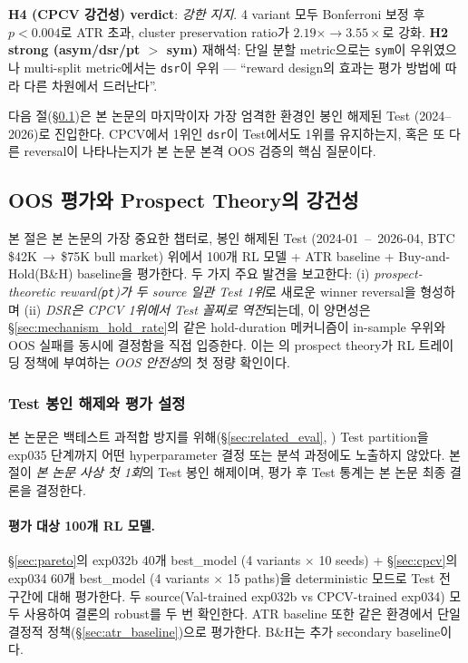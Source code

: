 \documentclass[11pt, a4paper]{article}
\begin{document}
\textbf{H4 (CPCV 강건성) verdict}: \emph{강한 지지}. 4 variant 모두 Bonferroni
보정 후 $p < 0.004$로 ATR 초과, cluster preservation ratio가 $2.19\times \to
3.55\times$로 강화. \textbf{H2 strong (asym/dsr/pt $>$ sym)} 재해석: 단일 분할
metric으로는 \texttt{sym}이 우위였으나 multi-split metric에서는 \texttt{dsr}이
우위 --- ``reward design의 효과는 평가 방법에 따라 다른 차원에서 드러난다''.

다음 절(\S\ref{sec:oos})은 본 논문의 마지막이자 가장 엄격한 환경인 봉인 해제된
Test (2024--2026)로 진입한다. CPCV에서 1위인 \texttt{dsr}이 Test에서도 1위를
유지하는지, 혹은 또 다른 reversal이 나타나는지가 본 논문 본격 OOS 검증의 핵심
질문이다.

\subsection{OOS 평가와 Prospect Theory의 강건성}
\label{sec:oos}

본 절은 본 논문의 가장 중요한 챕터로, 봉인 해제된 Test (2024-01 \,--\, 2026-04,
BTC \$42K\,$\to$\,\$75K bull market) 위에서 100개 RL 모델 + ATR baseline +
Buy-and-Hold(B\&H) baseline을 평가한다. 두 가지 주요 발견을 보고한다:
(i) \emph{prospect-theoretic reward(\texttt{pt})가 두 source 일관 Test 1위}로
새로운 winner reversal을 형성하며 (ii) \emph{DSR은 CPCV 1위에서 Test 꼴찌로
역전}되는데, 이 양면성은 \S\ref{sec:mechanism_hold_rate}의 같은 hold-duration
메커니즘이 in-sample 우위와 OOS 실패를 동시에 결정함을 직접 입증한다. 이는
\citet{kahneman1979prospect}의 prospect theory가 RL 트레이딩 정책에 부여하는
\emph{OOS 안전성}의 첫 정량 확인이다.

\subsubsection{Test 봉인 해제와 평가 설정}
\label{sec:oos_setup}

본 논문은 백테스트 과적합 방지를 위해(\S\ref{sec:related_eval},
\citealt{gort2022backtest}) Test partition을 exp035 단계까지 어떤 hyperparameter
결정 또는 분석 과정에도 노출하지 않았다. 본 절이 \emph{본 논문 사상 첫
1회}의 Test 봉인 해제이며, 평가 후 Test 통계는 본 논문 최종 결론을 결정한다.

\paragraph{평가 대상 100개 RL 모델.}
\S\ref{sec:pareto}의 exp032b 40개 best\_model (4 variants $\times$ 10 seeds) +
\S\ref{sec:cpcv}의 exp034 60개 best\_model (4 variants $\times$ 15 paths)을
deterministic 모드로 Test 전 구간에 대해 평가한다. 두 source(Val-trained
exp032b vs CPCV-trained exp034) 모두 사용하여 결론의 robust를 두 번 확인한다.
ATR baseline 또한 같은 환경에서 단일 결정적 정책(\S\ref{sec:atr_baseline})으로
평가한다. B\&H는 추가 secondary baseline이다.
\end{document}
